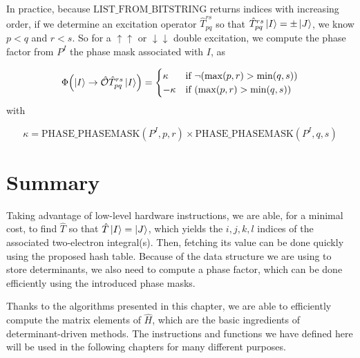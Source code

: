 \documentclass[./thesis.tex]{subfiles}
\begin{document}
In practice, because $\text{LIST\_FROM\_BITSTRING}$ returns indices with increasing order, if we determine an excitation operator $\hat T_{pq}^{rs}$ so that $\hat T_{pq}^{rs} \ket I = \pm \ket J$, we know $p<q$ and $r<s$. So for a $\uparrow \uparrow$ or $\downarrow \downarrow$ double excitation, we compute the phase factor from $P^I$ the phase mask associated with $I$, as



\begin{align}
{\Phi \qty(\ket I \rightarrow {\hat{\mathcal{O}}}\hat T_{pq}^{rs} \ket I)} = 
\begin{cases}
\kappa & \text{if } \neg \qty( \max(p,r) > \min(q,s) ) \\
-\kappa & \text{if } \qty( \max(p,r) > \min(q,s) )
\end{cases}
\end{align}
with 

\begin{equation}
\kappa = \text{PHASE\_PHASEMASK}(P^I, p,r) \times \text{PHASE\_PHASEMASK}(P^I, q,s)
\end{equation}
\section{Summary}



Taking advantage of low-level hardware instructions, we are able, for a minimal cost, to find $\hat T$ so that $\hat T \ket I = \ket J$, which yields the $i,j,k,l$ indices of the associated two-electron integral(s). Then, fetching its value can be done quickly using the proposed hash table.
Because of the data structure we are using to store determinants, we also need to compute a phase factor, which can be done efficiently using the introduced phase masks. 

Thanks to the algorithms presented in this chapter, we are able to efficiently compute the matrix elements of $\hat H$, which are the basic ingredients of determinant-driven methods. The instructions and functions we have defined here will be used in the following chapters for many different purposes.
\end{document}
